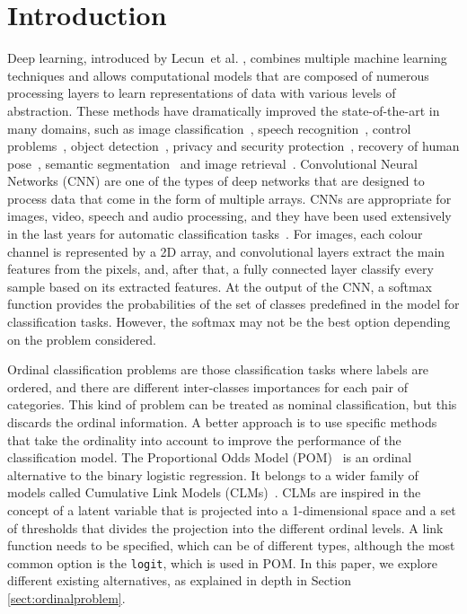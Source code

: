 \documentclass[preprint]{elsarticle}
\begin{document}
\section{Introduction}
\label{sect:introduction}
Deep learning, introduced by Lecun~et al. \cite{lecun2015deep}, combines multiple machine learning techniques and allows computational models that are composed of numerous processing layers to learn representations of data with various levels of abstraction. These methods have dramatically improved the state-of-the-art in many domains, such as image classification~\cite{cirecsan2012multi,he2016deep,krizhevsky2012imagenet}, speech recognition~\cite{hinton2012deep}, control problems~\cite{mnih2015human}, object detection~\cite{jiang2016speed,girshick2014rich}, privacy and security protection~\cite{yu2017iprivacy,yuan2019adversarial,tan2018deep}, recovery of human pose~\cite{hong2015multimodal}, semantic segmentation~\cite{long2015fully} and image retrieval~\cite{li2015weakly,jin2018deep}. Convolutional Neural Networks (CNN) are one of the types of deep networks that are designed to process data that come in the form of multiple arrays. CNNs are appropriate for images, video, speech and audio processing, and they have been used extensively in the last years for automatic classification tasks~\cite{dong2014learning,sun2013deep,ronneberger2015u}. For images, each colour channel is represented by a 2D array, and convolutional layers extract the main features from the pixels, and, after that, a fully connected layer classify every sample based on its extracted features. At the output of the CNN, a softmax function provides the probabilities of the set of classes predefined in the model for classification tasks. However, the softmax may not be the best option depending on the problem considered.

Ordinal classification problems are those classification tasks where labels are ordered, and there are different inter-classes importances for each pair of categories. This kind of problem can be treated as nominal classification, but this discards the ordinal information. A better approach is to use specific methods that take the ordinality into account to improve the performance of the classification model. The Proportional Odds Model (POM)~\cite{mccullagh1980regression} is an ordinal alternative to the binary logistic regression. It belongs to a wider family of models called Cumulative Link Models (CLMs)~\cite{agresti2010analysis}. CLMs are inspired in the concept of a latent variable that is projected into a 1-dimensional space and a set of thresholds that divides the projection into the different ordinal levels. A link function needs to be specified, which can be of different types, although the most common option is the \texttt{logit}, which is used in POM. In this paper, we explore different existing alternatives, as explained in depth in Section \ref{sect:ordinalproblem}.
\end{document}
